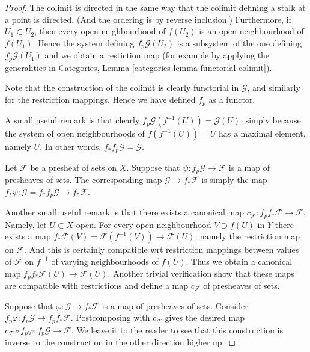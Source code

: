 \begin{proof}
The colimit is directed in the same way that the colimit
defining a stalk at a point is directed. (And the
ordering is by reverse inclusion.) Furthermore, if
$U_1 \subset U_2$, then every open neighbourhood of $f(U_2)$
is an open neighbourhood of $f(U_1)$. Hence the system defining
$f_p\mathcal{G}(U_2)$ is a subsystem of the one defining
$f_p\mathcal{G}(U_1)$ and we obtain a restiction map (for
example by applying the generalities in Categories,
Lemma \ref{categories-lemma-functorial-colimit}).

\medskip\noindent
Note that the construction of the colimit is clearly functorial
in $\mathcal{G}$, and similarly for the restriction mappings.
Hence we have defined $f_p$ as a functor.

\medskip\noindent
A small useful remark is that clearly $f_p\mathcal{G}(f^{-1}(U))
= \mathcal{G}(U)$, simply because the system of open neighbourhoods
of $f(f^{-1}(U)) = U$ has a maximal element, namely $U$. 
In other words, $f_* f_p\mathcal{G} = \mathcal{G}$.

\medskip\noindent
Let $\mathcal{F}$ be a presheaf of sets on $X$.
Suppose that $\psi : f_p\mathcal{G} \to \mathcal{F}$
is a map of presheaves of sets. The corresponding map
$\mathcal{G} \to f_*\mathcal{F}$ is simply the map
$f_*\psi : \mathcal{G} = f_* f_p \mathcal{G} \to f_* \mathcal{F}$.

\medskip\noindent
Another small useful remark is that there exists a
canonical map $c_{\mathcal{F}} : f_p f_* \mathcal{F} \to \mathcal{F}$.
Namely, let $U \subset X$ open. 
For every open neighbourhood $V \supset f(U)$ in $Y$
there exists a map
$f_*\mathcal{F}(V) = \mathcal{F}(f^{-1}(V))\to \mathcal{F}(U)$,
namely the restriction map on $\mathcal{F}$. And this is certainly
compatible wrt restriction mappings between values of $\mathcal{F}$
on $f^{-1}$ of varying neighbourhoods of $f(U)$. Thus we obtain
a canonical map $f_p f_* \mathcal{F}(U) \to \mathcal{F}(U)$.
Another trivial verification show that these maps are compatible
with restrictions and define a map $c_{\mathcal{F}}$
of presheaves of sets.

\medskip\noindent
Suppose that $\varphi : \mathcal{G} \to f_*\mathcal{F}$
is a map of presheaves of sets. Consider $f_p\varphi :
f_p \mathcal{G} \to f_p f_* \mathcal{F}$. 
Postcomposing with $c_{\mathcal{F}}$ gives the desired map
$c_{\mathcal{F}} \circ f_p\varphi : f_p\mathcal{G} \to \mathcal{F}$.
We leave it to the reader to see that this construction is inverse
to the construction in the other direction higher up.
\end{proof}

